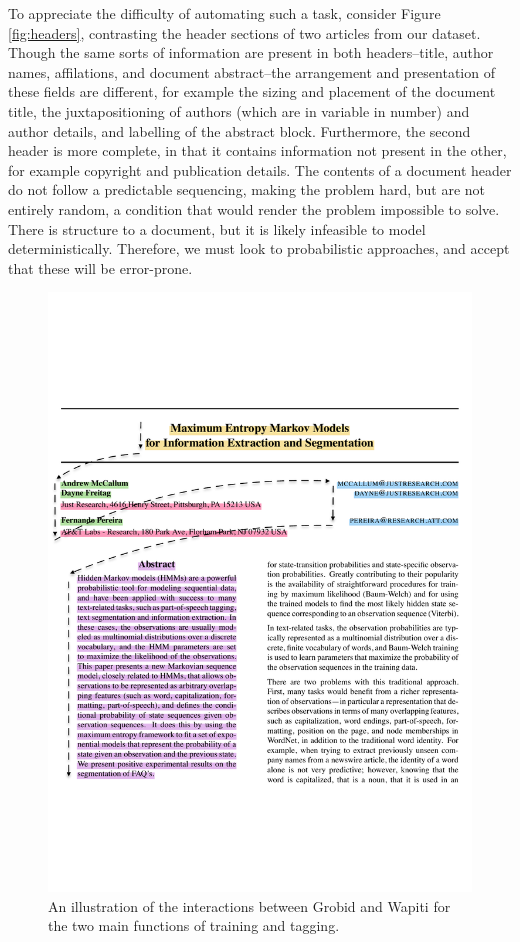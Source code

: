 To appreciate the difficulty of automating such a task, consider Figure \ref{fig:headers}, contrasting the header sections of two articles from our dataset. Though the same sorts of information are present in both headers--title, author names, affilations, and document abstract--the arrangement and presentation of these fields are different, for example the sizing and placement of the document title, the juxtapositioning of authors (which are in variable in number) and author details, and labelling of the abstract block. Furthermore, the second header is more complete, in that it contains information not present in the other, for example copyright and publication details. The contents of a document header do not follow a predictable sequencing, making the problem hard, but are not entirely random, a condition that would render the problem impossible to solve. There is structure to a document, but it is likely infeasible to model deterministically. Therefore, we must look to probabilistic approaches, and accept that these will be error-prone.

\begin{figure}[!ht]
\center
\includegraphics[width=\textwidth]{Figures/extraction.pdf}
\caption{An illustration of the interactions between Grobid and Wapiti for the two main functions of training and tagging.}
\label{fig:grobid}
\end{figure}

